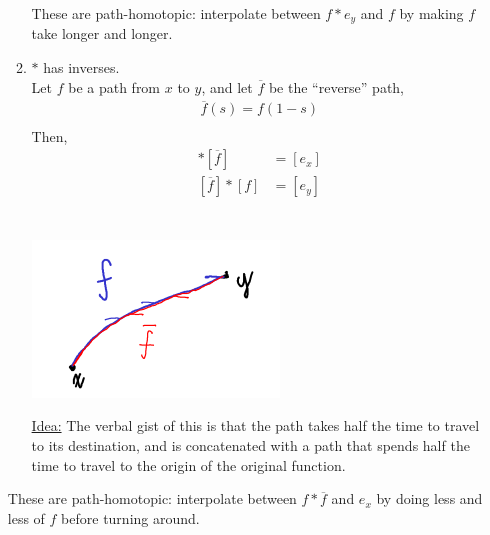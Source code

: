 \begin{itemize}
\begin{enumerate}
\begin{minipage}[c]{\linewidth}
\begin{center}
                        \end{center}
                    \end{minipage}
                    These are path-homotopic: interpolate between $f*e_y$ and $f$ by making
                    $f$ take longer and longer.
                \item $*$ has inverses.\\
                    Let $f$ be a path from $x$ to $y$, and let $\overline{f}$ be the ``reverse'' path,
                    \begin{align*}
                        \overline{f}(s)=f(1-s)\\
                    \end{align*}
                    Then,
                    \begin{align*}
                        [f]*[\overline{f}]&=[e_x]\\
                        [\overline{f}]*[f]&=[e_y]\\
                    \end{align*}\\
                    \begin{minipage}[c]{\linewidth}
                        \begin{center}
                            \includegraphics[]{images/path_inverse.png}
                        \end{center}
                    \end{minipage}
                    \underline{Idea:} 
                    The verbal gist of this is that the path takes half the time to travel to its destination, and
                    is concatenated with a path that spends half the time to travel to the origin of the original
                    function.\\
            \end{enumerate}
    \begin{itemize}
            These are path-homotopic: interpolate between $f*\overline{f}$ and $e_x$ by doing less and less
            of $f$ before turning around.

\end{itemize}
\end{itemize}
